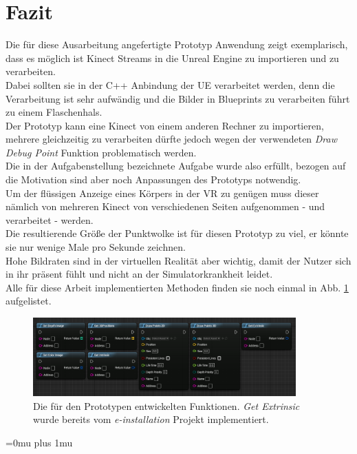 \documentclass[a4paper]{IEEEtran}
\begin{document}
	


\section{Fazit}
	Die für diese Ausarbeitung angefertigte Prototyp Anwendung zeigt exemplarisch, dass es möglich ist Kinect Streams in die Unreal Engine zu importieren und zu verarbeiten.\\
	Dabei sollten sie in der C++ Anbindung der UE verarbeitet werden, denn die Verarbeitung ist sehr aufwändig und die Bilder in Blueprints zu verarbeiten führt zu einem Flaschenhals.\\
	Der Prototyp kann eine Kinect von einem anderen Rechner zu importieren, mehrere gleichzeitig zu verarbeiten dürfte jedoch wegen der verwendeten {\textit{Draw Debug Point}} Funktion problematisch werden. \\
	Die in der Aufgabenstellung bezeichnete Aufgabe wurde also erfüllt, bezogen auf die Motivation sind aber noch Anpassungen des Prototyps notwendig.\\
	Um der flüssigen Anzeige eines Körpers in der VR zu genügen muss dieser nämlich von mehreren Kinect von verschiedenen Seiten aufgenommen - und verarbeitet - werden. \\
	Die resultierende Größe der Punktwolke ist für diesen Prototyp zu viel, er könnte sie nur wenige Male pro Sekunde zeichnen. \\
	Hohe Bildraten sind in der virtuellen Realität aber wichtig, damit der Nutzer sich in ihr präsent fühlt und nicht an der Simulatorkrankheit leidet. \\
	Alle für diese Arbeit implementierten Methoden finden sie noch einmal in Abb. \ref{AllFunctionsBP} aufgelistet.\\[0.5cm]
	
		\begin{figure}[!h]
    	\centering
		\includegraphics[width=0.9\textwidth]{img/AllFunctionsBP}
	    \caption{Die für den Prototypen entwickelten Funktionen. {\textit{Get Extrinsic}} wurde bereits vom {\textit{e-installation}} Projekt implementiert.}
    	\label{AllFunctionsBP}
	\end{figure}
	


\Urlmuskip=0mu plus 1mu\relax


\end{document}
